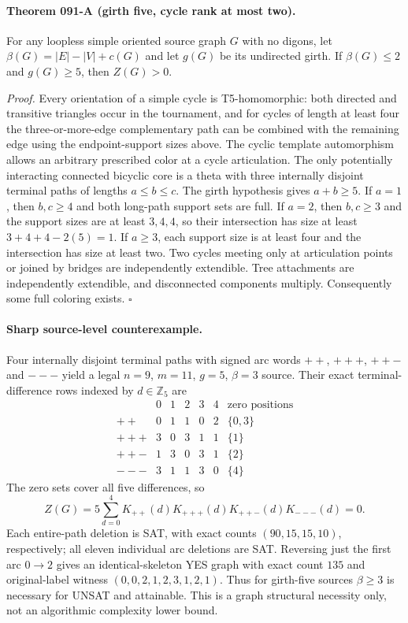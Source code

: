 \documentclass[11pt]{article}
\begin{document}
\paragraph{Theorem 091-A (girth five, cycle rank at most two).}
For any loopless simple oriented source graph $G$ with no digons,
let $\beta(G)=|E|-|V|+c(G)$ and let $g(G)$ be its undirected
girth. If $\beta(G)\leq2$ and $g(G)\geq5$, then $Z(G)>0$.

\emph{Proof.} Every orientation of a simple cycle is
T5-homomorphic: both directed and transitive triangles occur in
the tournament, and for cycles of length at least four the
three-or-more-edge complementary path can be combined with the
remaining edge using the endpoint-support sizes above. The
cyclic template automorphism allows an arbitrary prescribed
color at a cycle articulation. The only potentially interacting
connected bicyclic core is a theta with three internally disjoint
terminal paths of lengths $a\leq b\leq c$.
The girth hypothesis gives $a+b\geq5$. If $a=1$, then
$b,c\geq4$ and both long-path support sets are full.
If $a=2$, then $b,c\geq3$ and the support sizes are at least
$3,4,4$, so their intersection has size at least
$3+4+4-2(5)=1$. If $a\geq3$, each support size is at
least four and the intersection has size at least two.
Two cycles meeting only at articulation points or joined by
bridges are independently extendible. Tree attachments are
independently extendible, and disconnected components multiply.
Consequently some full coloring exists. $\square$

\paragraph{Sharp source-level counterexample.}
Four internally disjoint terminal paths with signed arc words
$++$, $+++$, $++-$ and $---$ yield a legal $n=9$, $m=11$,
$g=5$, $\beta=3$ source. Their exact terminal-difference
rows indexed by $d\in\mathbb Z_5$ are
\[
\begin{array}{c|rrrrr|c}
 &0&1&2&3&4&\text{zero positions}\\\hline
++  &0&1&1&0&2 &\{0,3\}\\
+++ &3&0&3&1&1 &\{1\}\\
++- &1&3&0&3&1 &\{2\}\\
--- &3&1&1&3&0 &\{4\}
\end{array}
\]
The zero sets cover all five differences, so
\[
Z(G)=5\sum_{d=0}^{4}
K_{++}(d)K_{+++}(d)K_{++-}(d)K_{---}(d)=0.
\]
Each entire-path deletion is SAT, with exact counts
$(90,15,15,10)$, respectively; all eleven individual arc
deletions are SAT. Reversing just the first arc $0\to2$
gives an identical-skeleton YES graph with exact count $135$
and original-label witness
$(0,0,2,1,2,3,1,2,1)$.
Thus for girth-five sources $\beta\geq3$ is necessary
for UNSAT and attainable. This is a graph structural
necessity only, not an algorithmic complexity lower bound.
\end{document}
